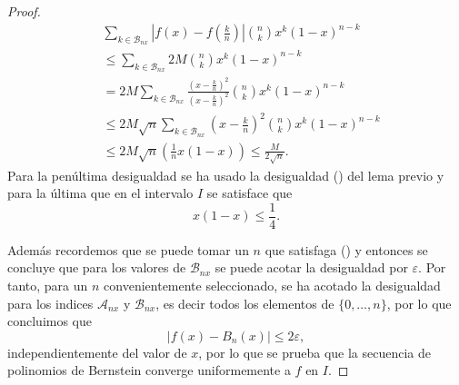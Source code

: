 \begin{proof}
    \begin{align*}
        &\sum_{k \in \mathcal{B}_{n x} } \left|f(x) - f \left( \frac{k}{n} \right)\right|
     \binom{n}{k} x^{k} (1-x)^{n-k}
     \\
     & 
     \leq 
      \sum_{k \in \mathcal{B}_{n x}} 2M 
    \binom{n}{k} x^{k} (1-x)^{n-k}
    \\ 
    & 
    = 2M \sum_{k \in \mathcal{B}_{n x}} 
    \frac{
        \left(x- \frac{k}{n}\right)^2
    }{
        \left(x- \frac{k}{n}\right)^2
    }
    \binom{n}{k} x^{k} (1-x)^{n-k}
    \\
    &
    \leq 2M 
    \sqrt{n}
    \sum_{k \in \mathcal{B}_{n x}} 
    \left(x- \frac{k}{n}\right)^2
    \binom{n}{k} x^{k} (1-x)^{n-k}
    \\
    & %
    \leq
    2M \sqrt{n}
    \left(
        \frac{1}{n} x(1-x)
    \right)
    \leq 
    \frac{M}{2 \sqrt{n}}.
    \end{align*}
    Para la penúltima desigualdad se ha usado 
    la desigualdad () del lema previo y para la última que en el intervalo $I$ se satisface que 
    \begin{equation*}
        x (1-x) \leq \frac{1}{4}.
    \end{equation*}

    Además recordemos que se puede tomar un  $n$ que satisfaga () y entonces se concluye que para los valores de
    $\mathcal{B}_{n x}$ se puede acotar la desigualdad por $\varepsilon$. 
    Por tanto, para un $n$ convenientemente seleccionado, se ha acotado la desigualdad para los  indices $\mathcal{A}_{n x}$ y $\mathcal{B}_{n x}$, es decir todos los elementos de $\{0, \ldots, n\}$, por lo que concluimos que 
    \begin{equation*}
        |f(x) - B_n(x)| \leq 2 \varepsilon,
    \end{equation*}
    independientemente del valor de $x$, por lo que se prueba que la secuencia de polinomios de Bernstein converge uniformemente a $f$ en $I$.
\end{proof}